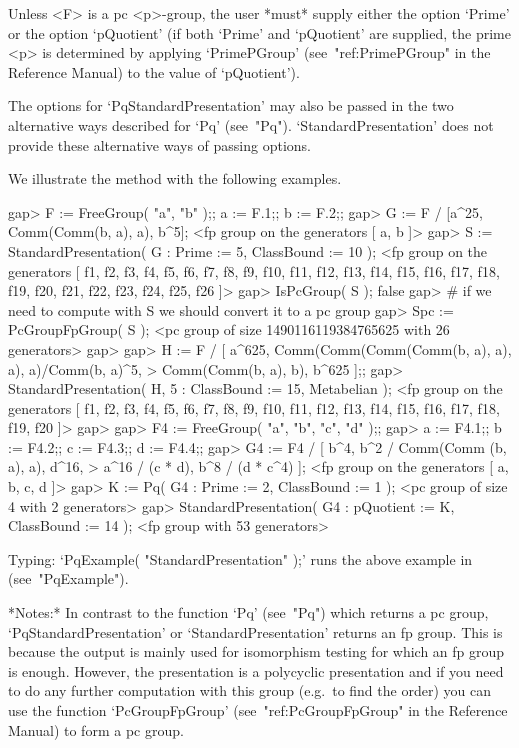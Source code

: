 \endlist

Unless <F> is a pc <p>-group, the user *must* supply  either  the  option
`Prime' or the option `pQuotient' (if both `Prime'  and  `pQuotient'  are
supplied,  the  prime  <p>  is  determined  by   applying   `PrimePGroup'
(see~"ref:PrimePGroup"  in  the  Reference  Manual)  to  the   value   of
`pQuotient').

The options for `PqStandardPresentation' may also be passed  in  the  two
alternative ways described for  `Pq'  (see~"Pq").  `StandardPresentation'
does not provide these alternative ways of passing options.

We illustrate the method with the following examples.

\beginexample
gap> F := FreeGroup( "a", "b" );; a := F.1;; b := F.2;;
gap> G := F / [a^25, Comm(Comm(b, a), a), b^5];
<fp group on the generators [ a, b ]>
gap> S := StandardPresentation( G : Prime := 5, ClassBound := 10 );
<fp group on the generators [ f1, f2, f3, f4, f5, f6, f7, f8, f9, f10, f11, 
  f12, f13, f14, f15, f16, f17, f18, f19, f20, f21, f22, f23, f24, f25, f26 ]>
gap> IsPcGroup( S );
false
gap> # if we need to compute with S we should convert it to a pc group
gap> Spc := PcGroupFpGroup( S );
<pc group of size 1490116119384765625 with 26 generators>
gap> 
gap> H := F / [ a^625, Comm(Comm(Comm(Comm(b, a), a), a), a)/Comm(b, a)^5,
>               Comm(Comm(b, a), b), b^625 ];;                     
gap> StandardPresentation( H, 5 : ClassBound := 15, Metabelian );
<fp group on the generators [ f1, f2, f3, f4, f5, f6, f7, f8, f9, f10, f11, 
  f12, f13, f14, f15, f16, f17, f18, f19, f20 ]>
gap> 
gap> F4 := FreeGroup( "a", "b", "c", "d" );;                        
gap> a := F4.1;; b := F4.2;; c := F4.3;; d := F4.4;;
gap> G4 := F4 / [ b^4, b^2 / Comm(Comm (b, a), a), d^16,                
>                 a^16 / (c * d), b^8 / (d * c^4) ];
<fp group on the generators [ a, b, c, d ]>
gap> K := Pq( G4 : Prime := 2, ClassBound := 1 );
<pc group of size 4 with 2 generators>
gap> StandardPresentation( G4 : pQuotient := K, ClassBound := 14 );
<fp group with 53 generators>
\endexample

Typing: `PqExample( "StandardPresentation" );' runs the above example  in
{\GAP} (see~"PqExample").

*Notes:*
In contrast  to the  function `Pq' (see~"Pq")  which returns a  pc group,
`PqStandardPresentation' or `StandardPresentation' returns an  fp  group.
This is because the output is mainly used  for  isomorphism  testing  for
which an fp group is enough. However, the presentation  is  a  polycyclic
presentation and if you need to do  any  further  computation  with  this
group (e.g.~to find the order) you can use the function  `PcGroupFpGroup'
(see~"ref:PcGroupFpGroup" in the {\GAP} Reference Manual) to  form  a  pc
group.


